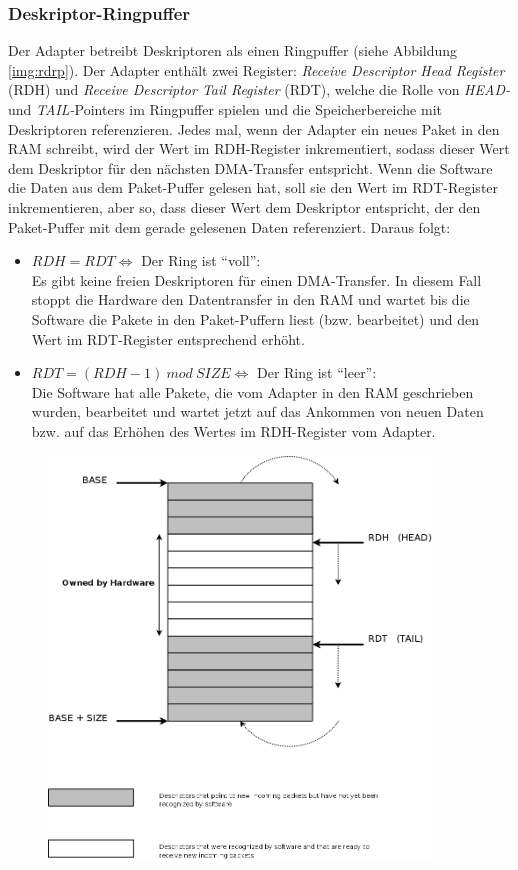 {\subsubsection*{Deskriptor-Ringpuffer}\label{sec:deskr_format} 
Der Adapter betreibt Deskriptoren  als einen Ringpuffer (siehe Abbildung
\ref{img:rdrp}). Der Adapter enthält zwei Register: \emph{Receive Descriptor Head
Register} (RDH) und \emph{Receive Descriptor Tail Register} (RDT), welche die
Rolle von \emph{HEAD-} und \emph{TAIL-}Pointers im Ringpuffer spielen und die
Speicherbereiche mit Deskriptoren referenzieren. Jedes mal, wenn der Adapter ein neues Paket
in den RAM schreibt, wird der Wert im RDH-Register inkrementiert, sodass dieser
Wert dem Deskriptor für den nächsten DMA-Transfer entspricht.  Wenn die
Software die Daten aus dem Paket-Puffer gelesen hat, soll sie den Wert im
RDT-Register inkrementieren, aber so, dass dieser Wert dem Deskriptor entspricht,
der den Paket-Puffer mit dem gerade gelesenen Daten referenziert.
Daraus folgt: 
\begin{itemize}
	\item $RDH = RDT \Longleftrightarrow$ Der Ring ist ``voll'':\\ Es gibt
		keine freien Deskriptoren für einen DMA-Transfer. In diesem Fall stoppt
		die Hardware den Datentransfer in den RAM und wartet bis die Software
		die Pakete in den Paket-Puffern liest (bzw. bearbeitet) und den Wert im
		RDT-Register entsprechend erhöht.
	\item $RDT = (RDH - 1)\ mod\ SIZE \Longleftrightarrow$ Der Ring ist
		``leer'':\\ Die Software hat alle Pakete, die vom Adapter in den RAM
		geschrieben wurden,  bearbeitet und wartet jetzt auf das Ankommen von
		neuen Daten bzw. auf das Erhöhen des Wertes im RDH-Register vom
		Adapter.
\end{itemize}
\begin{figure}
\centering \includegraphics[width=4.0in]{bilder/DescriptorRing}

\end{figure}}
